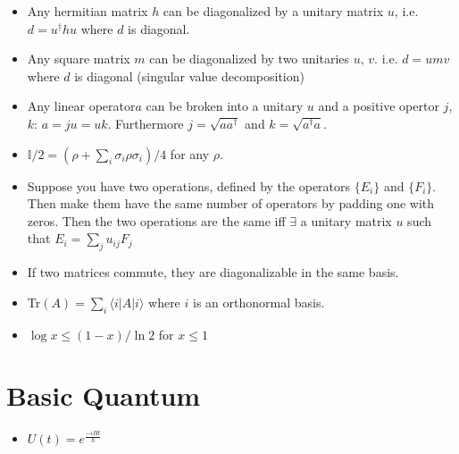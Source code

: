 \documentclass[12pt]{article}
\begin{document}
\begin{itemize}
\item Any hermitian matrix $h$ can be diagonalized by a unitary matrix $u$, i.e. $d=u^\dagger h u$ where $d$ is diagonal.
\item Any square matrix $m$ can be diagonalized by two unitaries $u$, $v$. i.e. $d=umv$ where $d$ is diagonal (singular value decomposition)
\item Any linear operator$a$ can be broken into a unitary $u$ and a positive opertor $j$, $k$: $a=ju=uk$. Furthermore $j=\sqrt{aa^\dagger}$ and $k=\sqrt{a^\dagger a}$.
\item $\mathbb{I}/2=(\rho+\sum_i\sigma_i\rho\sigma_i)/4$ for any $\rho$.
\item Suppose you have two operations, defined by the operators $\{E_i\}$ and $\{F_i\}$. Then make them have the same number of operators by padding one with zeros. Then the two operations are the same iff $\exists$ a unitary matrix $u$ such that $E_i=\sum_j u_{ij}F_j$
\item If two matrices commute, they are diagonalizable in the same basis.
\item Tr$(A)=\sum_i\langle i|A|i\rangle$ where $i$ is an orthonormal basis.
\item $\log x \leq (1-x)/\ln 2$ for $x\leq 1$
\end{itemize}

\section{Basic Quantum}
\begin{itemize}
\item $U(t)=e^{\frac{-i H t}{\hbar}}$
\end{itemize}
\end{document}
